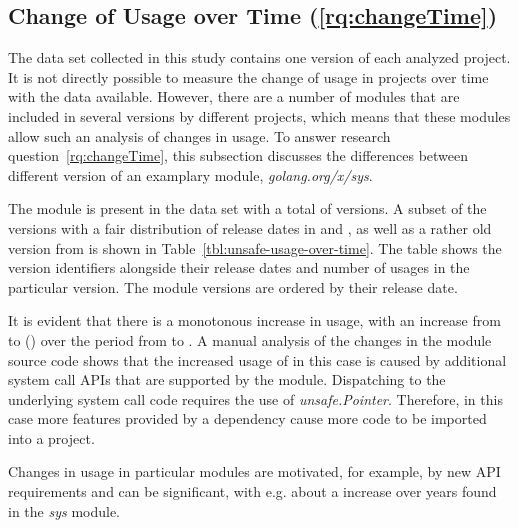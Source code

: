 \subsection{Change of Usage over Time (\ref{rq:changeTime})}\label{subsec:go-geiger:evaluation:over-time}

The data set collected in this study contains one version of each analyzed project.
It is not directly possible to measure the change of \unsafe{} usage in projects over time with the data available.
However, there are a number of modules that are included in several versions by different projects, which means that
these modules allow such an analysis of changes in \unsafe{} usage.
To answer research question~\ref{rq:changeTime}, this subsection discusses the differences between different version of
an examplary module, \textit{golang.org/x/sys}.

The module is present in the data set with a total of \sysModuleVersions{} versions.
A subset of the versions with a fair distribution of release dates in  and , as well as a
rather old version from  is shown in Table~\ref{tbl:unsafe-usage-over-time}.
The table shows the version identifiers alongside their release dates and number of \unsafe{} usages in the particular
version.
The module versions are ordered by their release date.



It is evident that there is a monotonous increase in \unsafe{} usage, with an increase from \sysModuleLeastUnsafe{} to
\sysModuleMostUnsafe{} (\sysModuleUnsafeIncrease) over the  period from  to
.
A manual analysis of the changes in the module source code shows that the increased usage of \unsafe{} in this case is
caused by additional system call \acrshort{API}s that are supported by the module.
Dispatching to the underlying system call code requires the use of \textit{unsafe.Pointer}.
Therefore, in this case more features provided by a dependency cause more \unsafe{} code to be imported into a project.


\begin{answerToRQ}[\ref{rq:changeTime}]
    Changes in \unsafe{} usage in particular modules are motivated, for example, by new \acrshort{API} requirements and
    can be significant, with e.g. about a \sysModuleUnsafeIncreaseRounded{} increase over  years found in
    the \textit{sys} module.
\end{answerToRQ}


